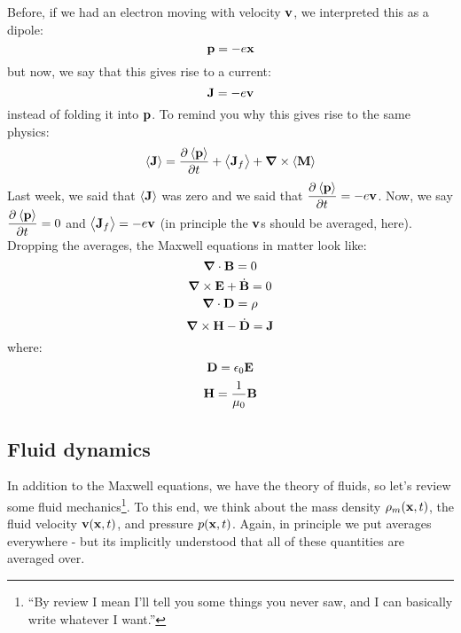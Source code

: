 Before, if we had an electron moving with velocity $\mathbf{v}$, we interpreted this as a dipole:
\begin{equation}
    \mathbf{p} = -e\mathbf{x}
\end{equation}
but now, we say that this gives rise to a current:
\begin{equation}
    \mathbf{J} = -e\mathbf{v}
\end{equation}
instead of folding it into $\mathbf{p}$. To remind you why this gives rise to the same physics:
\begin{equation}
    \avg{\v{J}} = \dpd{\avg{\v{p}}}{t} + \avg{\v{J}_f} + \nabla \times \avg{\v{M}}
\end{equation}
Last week, we said that $\left< \mathbf{J} \right>$ was zero and we said that $\dpd{\avg{\v{p}}}{t} = -e\v{v}$. Now, we say $\dpd{\avg{\v{p}}}{t} = 0$ and $\left< \mathbf{J}_f \right> = -e\mathbf{v}$ (in principle the $\mathbf{v}$s should be averaged, here). Dropping the averages, the Maxwell equations in matter look like:
\begin{equation}
    \nabla \cdot \v{B} = 0
\end{equation}
\begin{equation}
    \nabla \times \v{E} + \dot{\v{B}} = 0
\end{equation}
\begin{equation}
    \nabla \cdot \v{D} = \rho
\end{equation}
\begin{equation}
    \nabla \times \v{H} - \dot{\v{D}} = \v{J}
\end{equation}
where:
\begin{equation}
    \mathbf{D} = \epsilon_0\mathbf{E}
\end{equation}
\begin{equation}
    \mathbf{H} = \frac{1}{\mu_0}\mathbf{B}
\end{equation}

\subsection{Fluid dynamics}
In addition to the Maxwell equations, we have the theory of fluids, so let's review some fluid mechanics\footnote{``By review I mean I'll tell you some things you never saw, and I can basically write whatever I want.''}. To this end, we think about the mass density $\rho_m(\mathbf{x}, t)$, the fluid velocity $\mathbf{v}(\mathbf{x}, t)$, and pressure $p(\mathbf{x}, t)$. Again, in principle we put averages everywhere - but its implicitly understood that all of these quantities are averaged over.

